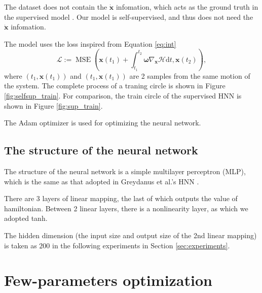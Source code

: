 \documentclass{article}
\begin{document}
The dataset does not contain the $\dot{\mathbf x}$ infomation,
which acts as the ground truth in the supervised model \cite{greydanus2019hamiltonian}.
Our model is self-supervised, and thus does not need the $\dot{\mathbf x}$ infomation.

The model uses the loss inspired from Equation \ref{eq:int}
\begin{equation}
	\mathcal L:=\operatorname{MSE}\left(\mathbf x\left(t_1\right)+\int_{t_1}^{t_2}\boldsymbol\omega\nabla_{\mathbf x}\mathcal H\mathrm dt,\mathbf x\left(t_2\right)\right),
\end{equation}
where $\left(t_1,\mathbf x\left(t_1\right)\right)$ and $\left(t_1,\mathbf x\left(t_1\right)\right)$
are 2 samples from the same motion of the system.
The complete process of a traning circle is shown in Figure \ref{fig:selfsup_train}.
For comparison, the train circle of the supervised HNN
is shown in Figure \ref{fig:sup_train}.

The Adam optimizer \cite{kingma2017adam} is used for optimizing the neural network.

\subsection{The structure of the neural network}

The structure of the neural network is a simple multilayer perceptron (MLP),
which is the same as that adopted in Greydanus et al.'s HNN \cite{greydanus2019hamiltonian}.

There are 3 layers of linear mapping, the last of which outputs the value of hamiltonian.
Between 2 linear layers, there is a nonlinearity layer, as which we adopted tanh.

The hidden dimension (the input size and output size of the 2nd linear mapping)
is taken as $200$ in the following experiments in Section \ref{sec:experiments}.

\section{Few-parameters optimization}
\end{document}
